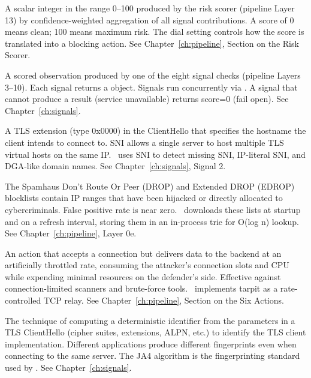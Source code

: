 \begin{description}[leftmargin=0pt, style=nextline, itemsep=8pt]
  \item[Risk score\index{risk score}]
  A scalar integer in the range 0–100 produced by the risk scorer (pipeline Layer 13)
  by confidence-weighted aggregation of all signal contributions. A score of 0 means
  clean; 100 means maximum risk. The dial setting controls how the score is
  translated into a blocking action.
  See Chapter~\ref{ch:pipeline}, Section on the Risk Scorer.

  \item[Signal\index{signal}]
  A scored observation produced by one of the eight signal checks (pipeline Layers
  3–10). Each signal returns a  object.
  Signals run concurrently via . A signal that cannot produce
  a result (service unavailable) returns score=0 (fail open).
  See Chapter~\ref{ch:signals}.

  \item[SNI (Server Name Indication)\index{SNI}]
  A TLS extension (type 0x0000) in the ClientHello that specifies the hostname the
  client intends to connect to. SNI allows a single server to host multiple TLS
  virtual hosts on the same IP. \ja\ uses SNI to detect missing SNI, IP-literal SNI,
  and DGA-like domain names.
  See Chapter~\ref{ch:signals}, Signal 2.

  \item[Spamhaus DROP/EDROP\index{Spamhaus DROP}\index{Spamhaus EDROP}]
  The Spamhaus Don't Route Or Peer (DROP) and Extended DROP (EDROP) blocklists
  contain IP ranges that have been hijacked or directly allocated to cybercriminals.
  False positive rate is near zero. \ja\ downloads these lists at startup and on a
  refresh interval, storing them in an in-process trie for O(log n) lookup.
  See Chapter~\ref{ch:pipeline}, Layer 0e.

  \item[Tarpit\index{tarpit}]
  An action that accepts a connection but delivers data to the backend at an
  artificially throttled rate, consuming the attacker's connection slots and CPU
  while expending minimal resources on the defender's side. Effective against
  connection-limited scanners and brute-force tools. \ja\ implements tarpit as a
  rate-controlled TCP relay.
  See Chapter~\ref{ch:pipeline}, Section on the Six Actions.

  \item[TLS fingerprinting\index{TLS fingerprinting}]
  The technique of computing a deterministic identifier from the parameters in a
  TLS ClientHello (cipher suites, extensions, ALPN, etc.) to identify the TLS
  client implementation. Different applications produce different fingerprints even
  when connecting to the same server. The JA4 algorithm is the fingerprinting
  standard used by \ja.
  See Chapter~\ref{ch:signals}.


\end{description}
